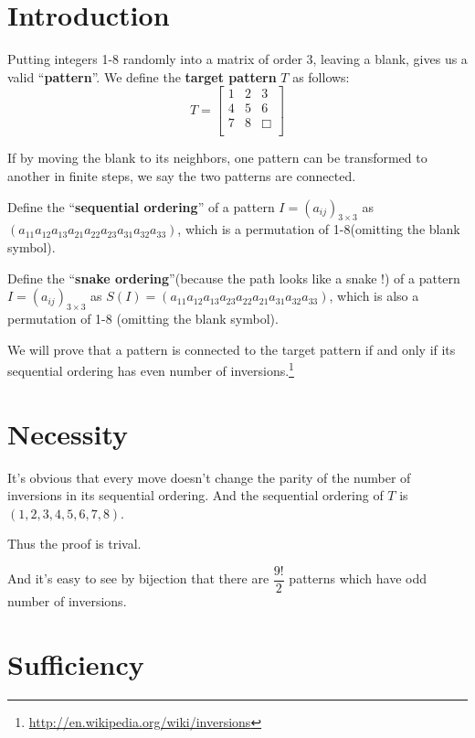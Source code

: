 
\section{Introduction}
Putting integers 1-8 randomly into a matrix of order 3, leaving a blank, gives us
a valid ``\textbf{pattern}''. We define the \textbf{target pattern} $ T$ as follows:
\[ T = \begin{bmatrix}
  1 & 2 & 3    \\
  4 & 5 & 6    \\
  7 & 8 & \Box \\
\end{bmatrix}\]

If by moving the blank to its neighbors, one pattern can be transformed to another
in finite steps, we say the two patterns are connected.

Define the ``\textbf{sequential ordering}'' of a pattern $ I = (a_{ij})_{3\times3}$
as $(a_{11}a_{12}a_{13}a_{21}a_{22}a_{23}a_{31}a_{32}a_{33})$, which is a
permutation of 1-8(omitting the blank symbol).

Define the ``\textbf{snake ordering}''(because the path looks like a snake !) of a pattern $ I = (a_{ij})_{3\times3}$
as $S(I) = (a_{11}a_{12}a_{13}a_{23}a_{22}a_{21}a_{31}a_{32}a_{33})$, which is also a
permutation of 1-8 (omitting the blank symbol).

We will prove that a pattern is connected to the target pattern if and only if
its sequential ordering has even number of inversions.\footnote{\url{http://en.wikipedia.org/wiki/inversions}}

\section{Necessity}
It's obvious that every move doesn't change the parity of the number of inversions in its sequential ordering.
And the sequential ordering of $ T$ is $ (1,2,3,4,5,6,7,8)$.

Thus the proof is trival.

And it's easy to see by bijection that there are $ \dfrac{9!}{2}$ patterns which have odd number of inversions.

\section{Sufficiency}

